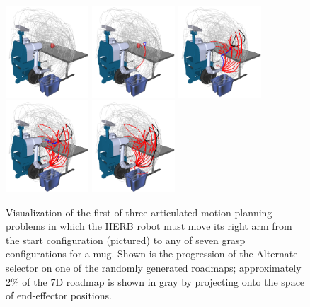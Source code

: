 \begin{figure}
\centering
\includegraphics[width=3.1cm]{figs/lazysp-herbarm/herbarm-roadmap.png}
\includegraphics[width=3.1cm]{figs/lazysp-herbarm/herbarm-path02.png}
\includegraphics[width=3.1cm]{figs/lazysp-herbarm/herbarm-path33.png}
\includegraphics[width=3.1cm]{figs/lazysp-herbarm/herbarm-path42.png}
\includegraphics[width=3.1cm]{figs/lazysp-herbarm/herbarm-path46.png}
\caption{Visualization of the first of three articulated motion
   planning problems in which the HERB robot must move its right arm
   from the start configuration (pictured)
   to any of seven grasp configurations for a mug.
   Shown is the progression of the Alternate selector on one of the
   randomly generated roadmaps;
   approximately 2\% of the 7D roadmap is shown in gray by projecting
   onto the space of end-effector positions.}
\label{fig:herbbin0}
\end{figure}

